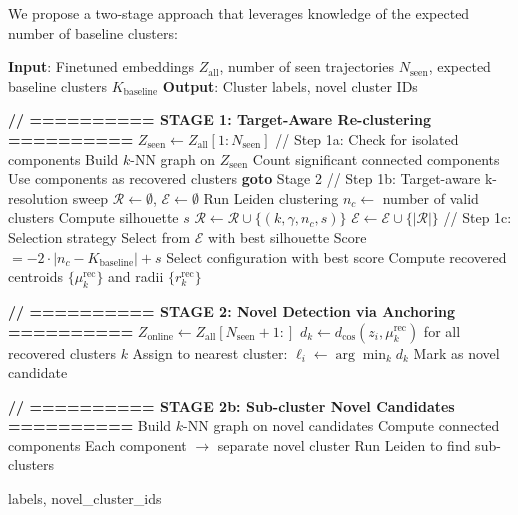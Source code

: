 \documentclass{article}
\begin{document}
We propose a two-stage approach that leverages knowledge of the expected number of baseline clusters:

\begin{algorithm}[H]
\caption{Two-Stage Target-Aware Clustering}
\begin{algorithmic}[1]
\STATE \textbf{Input}: Finetuned embeddings $Z_{\text{all}}$, number of seen trajectories $N_{\text{seen}}$, expected baseline clusters $K_{\text{baseline}}$
\STATE \textbf{Output}: Cluster labels, novel cluster IDs

\STATE
\STATE \textbf{// ========== STAGE 1: Target-Aware Re-clustering ==========}
\STATE $Z_{\text{seen}} \leftarrow Z_{\text{all}}[1:N_{\text{seen}}]$
\STATE
\STATE // Step 1a: Check for isolated components
    \STATE Build $k$-NN graph on $Z_{\text{seen}}$
    \STATE Count significant connected components
        \STATE Use components as recovered clusters
        \STATE \textbf{goto} Stage 2
    \ENDIF
\ENDFOR
\STATE
\STATE // Step 1b: Target-aware k-resolution sweep
\STATE $\mathcal{R} \leftarrow \emptyset$, $\mathcal{E} \leftarrow \emptyset$ 
        \STATE Run Leiden clustering
        \STATE $n_c \leftarrow$ number of valid clusters
        \STATE Compute silhouette $s$
        \STATE $\mathcal{R} \leftarrow \mathcal{R} \cup \{(k, \gamma, n_c, s)\}$
            \STATE $\mathcal{E} \leftarrow \mathcal{E} \cup \{|\mathcal{R}|\}$ 
        \ENDIF
    \ENDFOR
\ENDFOR
\STATE
\STATE // Step 1c: Selection strategy
    \STATE Select from $\mathcal{E}$ with best silhouette 
\ELSE
    \STATE Score $= -2 \cdot |n_c - K_{\text{baseline}}| + s$
    \STATE Select configuration with best score 
\ENDIF
\STATE
\STATE Compute recovered centroids $\{\mu_k^{\text{rec}}\}$ and radii $\{r_k^{\text{rec}}\}$

\STATE
\STATE \textbf{// ========== STAGE 2: Novel Detection via Anchoring ==========}
\STATE $Z_{\text{online}} \leftarrow Z_{\text{all}}[N_{\text{seen}}+1:]$
    \STATE $d_k \leftarrow d_{\cos}(z_i, \mu_k^{\text{rec}})$ for all recovered clusters $k$
        \STATE Assign to nearest cluster: $\ell_i \leftarrow \arg\min_k d_k$
    \ELSE
        \STATE Mark as novel candidate
    \ENDIF
\ENDFOR

\STATE
\STATE \textbf{// ========== STAGE 2b: Sub-cluster Novel Candidates ==========}
    \STATE Build $k$-NN graph on novel candidates
    \STATE Compute connected components
        \STATE Each component $\rightarrow$ separate novel cluster
    \ELSE
        \STATE Run Leiden to find sub-clusters
    \ENDIF
\ENDIF

\STATE
\RETURN labels, novel\_cluster\_ids
\end{algorithmic}
\end{algorithm}
\end{document}
